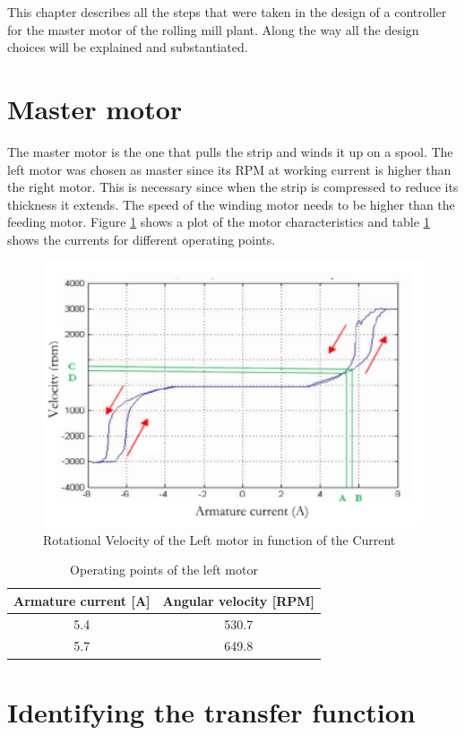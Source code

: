 This chapter describes all the steps that were taken in the design of a controller for the master motor of the rolling mill plant. Along the way all the design choices will be explained and substantiated.

\section{Master motor}
The master motor is the one that pulls the strip and winds it up on a spool. The left motor was chosen as master since its RPM at working current is higher than the right motor.  This is necessary since when the strip is compressed to reduce its thickness it extends. The speed of the winding motor needs to be higher than the feeding motor. Figure \ref{fig:LM_RPM_curr} shows a plot of the motor characteristics and table \ref{tab:LM_operating_region} shows the currents for different operating points.

\begin{figure}[htbp]
\centering
\includegraphics[width = .7\textwidth]{pics/LM_RPM_Current.png}
\caption{Rotational Velocity of the Left motor in function of the Current}
\label{fig:LM_RPM_curr}
\end{figure}

\begin{table}[H]
	\centering
		\begin{tabular}{c|c}
        \toprule
			Armature current [A] & Angular velocity [RPM] \\ \midrule
            5.4 & 530.7 \\
            5.7 & 649.8 \\
		\end{tabular}
	\caption{Operating points of the left motor}
	\label{tab:LM_operating_region}
\end{table}

\FloatBarrier
\section{Identifying the transfer function}


